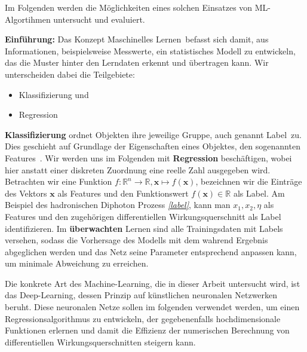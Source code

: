 Im Folgenden werden die Möglichkeiten eines solchen Einsatzes von ML-Algortihmen untersucht und evaluiert.

\textbf{Einführung:} Das Konzept \glqq Maschinelles Lernen\grqq~befasst sich damit, aus Informationen, beispielsweise Messwerte, ein statistisches Modell zu entwickeln, das die Muster hinter den Lerndaten erkennt und übertragen kann. Wir unterscheiden dabei die Teilgebiete:
\begin{itemize}
	\setlength\itemsep{0.1cm}
	\setlength{\parskip}{0.1cm}
	\item Klassifizierung und 
	\item Regression
\end{itemize}
\textbf{Klassifizierung} ordnet Objekten ihre jeweilige Gruppe, auch genannt \glqq Label\grqq~zu. Dies geschieht auf Grundlage der Eigenschaften eines Objektes, den sogenannten \glqq Features\grqq~.
Wir werden uns im Folgenden mit \textbf{Regression} beschäftigen, wobei hier anstatt einer diskreten Zuordnung eine reelle Zahl ausgegeben wird. Betrachten wir eine Funktion $f: \mathbb{R}^n \rightarrow \mathbb{R}, \mathbf{x} \mapsto f(\mathbf{x})$, bezeichnen wir die Einträge des Vektors $\mathbf{x}$ als Features und den Funktionswert $f(\mathbf{x}) \in \mathbb{R}$ als Label. Am Beispiel des hadronischen Diphoton Prozess \textit{\autoref{label}}, kann man $x_1, x_2, \eta$ als Features und den zugehörigen differentiellen Wirkungsquerschnitt als Label identifizieren. 
Im \textbf{überwachten} Lernen sind alle Trainingsdaten mit Labels versehen, sodass die Vorhersage des Modells mit dem wahrend Ergebnis abgeglichen werden und das Netz seine Parameter entsprechend anpassen kann, um minimale Abweichung zu erreichen. 

Die konkrete Art des Machine-Learning, die in dieser Arbeit untersucht wird, ist das Deep-Learning, dessen Prinzip auf künstlichen neuronalen Netzwerken beruht. Diese neuronalen Netze sollen im folgenden verwendet werden, um einen Regressionsalgorithmus zu entwickeln, der gegebenenfalls hochdimensionale Funktionen erlernen und damit die Effizienz der numerischen Berechnung von differentiellen Wirkungsquerschnitten steigern kann. 
